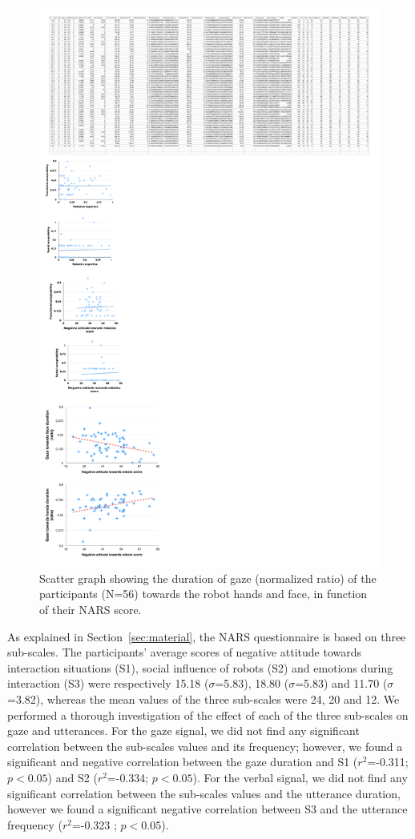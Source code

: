 \begin{figure}[ht!]
\centering
\includegraphics[width=0.5\hsize]{Serena/figures/plots_nars_gaze_3.pdf}
\caption{Scatter graph showing the duration of gaze (normalized ratio) of the participants (N=56) towards the robot hands and face, in function of their NARS score. }
\label{fig:narsgaze}
\end{figure}

As explained in Section~\ref{sec:material}, the NARS questionnaire is based on three sub-scales.
The participants' average scores of negative attitude towards interaction situations (S1), social influence of robots (S2) and emotions during interaction (S3) were respectively 15.18 ($\sigma$=5.83), 18.80 ($\sigma$=5.83) and 11.70 ($\sigma$=3.82), whereas the mean values of the three sub-scales were 24, 20 and 12. 
We performed a thorough investigation of the effect of each of the three sub-scales on gaze and utterances. 
For the gaze signal, we did not find any significant correlation between the sub-scales values and its frequency; however, we found a significant and negative correlation between the gaze duration and S1 ($r^2$=-0.311; \textbf{$p<0.05$}) and S2 ($r^2$=-0.334; \textbf{$p<0.05$}).
For the verbal signal, we did not find any significant correlation between the sub-scales values and the utterance duration, however we found a significant negative correlation between S3 and the utterance frequency ($r^2$=-0.323 ; \textbf{$p<0.05$}).

